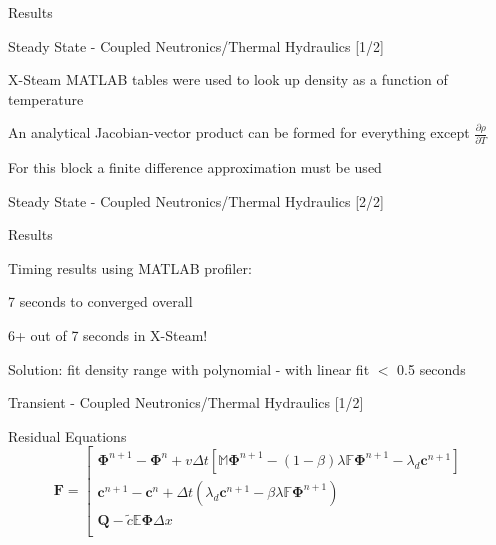 \documentclass{beamer}
\begin{document}
\begin{section}{Results}
\begin{frame}{Steady State - Coupled Neutronics/Thermal Hydraulics [1/2]}
\begin{customlist}{2ex}{0pt}
    \vfill\item X-Steam MATLAB tables were used to look up density as a function of temperature
    \vfill\item An analytical Jacobian-vector product can be formed for everything except $\frac{\partial\rho}{\partial T}$
    \vfill\item For this block a finite difference approximation must be used
  \end{customlist}
\end{frame}
\begin{frame}{Steady State - Coupled Neutronics/Thermal Hydraulics [2/2]}
  \begin{block}{Results}
    \begin{center}
      \scalebox{0.4}{}
    \end{center}
  \end{block}
  \begin{customlist}{2ex}{0pt}
    \vfill\item \small Timing results using MATLAB profiler:
    \begin{customlist}{2ex}{0pt}
      \vfill\item 7 seconds to converged overall
      \vfill\item 6+ out of 7 seconds in X-Steam!
      \vfill\item Solution: fit density range with polynomial - with linear fit $<$ 0.5 seconds
    \end{customlist}
  \end{customlist}
\end{frame}
\begin{frame}{Transient - Coupled Neutronics/Thermal Hydraulics [1/2]}
  \begin{block}{Residual Equations}
	\[
	    \mathbf{F}=\left[\begin{array}{c}
	    \mathbf{\Phi}^{n+1}-\mathbf{\Phi}^{n}+v\Delta t\left[\mathbb{M}\mathbf{\Phi}^{n+1}-\left(1-\beta\right)\lambda\mathbb{F}\mathbf{\Phi}^{n+1}-\lambda_{d}\mathbf{c}^{n+1}\right]\\
	    \mathbf{c}^{n+1}-\mathbf{c}^{n}+\Delta t\left(\lambda_{d}\mathbf{c}^{n+1}-\beta\lambda\mathbb{F}\mathbf{\Phi}^{n+1}\right)\\
	    \mathbf{Q}-\tilde{c}\mathbb{E}\mathbf{\Phi}\Delta x\\

\end{array}\]
\end{block}
\end{frame}
\end{section}
\end{document}
